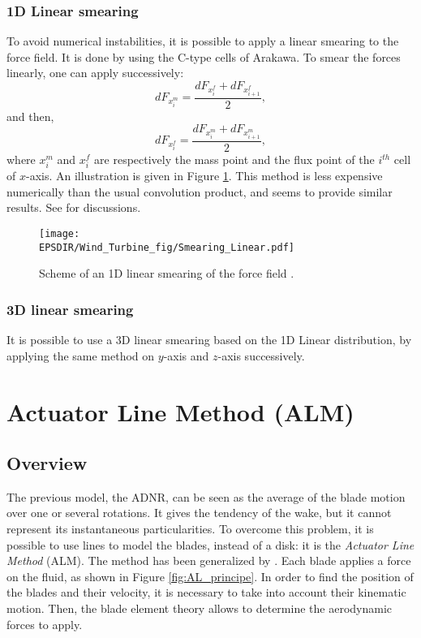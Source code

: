\subsubsection*{1D Linear smearing}
\label{sss:1dsmearADNR}
To avoid numerical instabilities, it is possible to apply a linear smearing to the force field. It is done by using the C-type cells of Arakawa. To smear the forces linearly, one can apply successively:
\begin{equation}
dF_{x_{i}^m} = \dfrac{dF_{x_{i}^f} + dF_{x_{i+1}^f}}{2},
\end{equation}
and then,
\begin{equation}
dF_{x_{i}^f} = \dfrac{dF_{x_{i}^m} + dF_{x_{i+1}^m}}{2},
\end{equation}
where $x_i^m$ and $x_i^f$ are respectively  the mass point and the flux point of the $i^{th}$ cell of $x$-axis. An illustration is given in Figure \ref{fig:smearinglin}. This method is less expensive numerically than the usual convolution product, and seems to provide similar results. See \cite{joulin2019modelisation} for discussions.

\begin{figure}[h]
\centering
\texttt{[image: \\EPSDIR/Wind\_Turbine\_fig/Smearing\_Linear.pdf]}
\caption{Scheme of an 1D linear smearing of the force field \citep{joulin2019modelisation}.}
\label{fig:smearinglin}  
\end{figure}

\subsubsection*{3D linear smearing}
\label{sss:3dsmearADNR}
It is possible to use a 3D linear smearing based on the 1D Linear distribution, by applying the same method on $y$-axis and $z$-axis successively.




\section{Actuator Line Method (ALM)}
\subsection{Overview}

The previous model, the ADNR, can be seen as the average of the blade motion over one or several rotations. It gives the tendency of the wake, but it cannot represent its instantaneous particularities. To overcome this problem, it is possible to use lines to model the blades, instead of a disk: it is the \textit{Actuator Line Method} (ALM). The method has been generalized by \cite{sorensen2002numerical}. Each blade applies a force on the fluid, as shown in Figure \ref{fig:AL_principe}. In order to find the position of the blades and their velocity, it is necessary to take into account their kinematic motion. Then, the blade element theory allows to determine the aerodynamic forces to apply.

